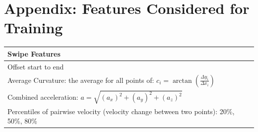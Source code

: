 \documentclass{llncs}
\begin{document}

 
\newpage

\section*{Appendix: Features Considered for Training}

\begin{table}
\centering
{\scriptsize
  \begin{tabularx}{\textwidth}{|X|}
  	\hline
  	\textbf{Swipe Features}                                                                                                 \\ \hline
  	Offset start to end                                                                                                     \\ \hline
  	Average Curvature: the average for all points of: $c_i = \arctan (\frac{\Delta y_i}{\Delta x_i})$~\cite{velten2015user} \\ \hline
  	Combined acceleration: $ a = \sqrt{(a_x)^2 + (a_y)^2 + (a_z)^2}$                                                        \\ \hline
  	Percentiles of pairwise velocity (velocity change between two points): 20\%, 50\%, 80\%~\cite{Frank13}                  \\ \hline
	

\end{tabularx}}
\end{table}
\end{document}
